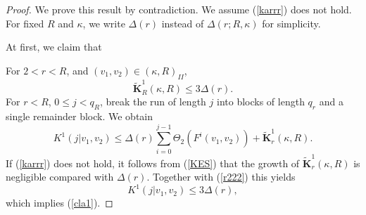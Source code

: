 \documentclass[10pt,a4paper]{amsart}
\begin{document}
\begin{proof}
We prove this result by contradiction. We assume (\ref{karrr}) does not hold.  For fixed $R$ and $\kappa$, we write $\Delta(r)$ instead of $\Delta(r;R,\kappa)$ for simplicity.

At first, we claim that

For $2< r<R$, and $(v_1,v_2)\in (\kappa,R)_{II}$,
\begin{equation}\label{cla1}
\widetilde{\mathbf{K}}_R^1(\kappa,R)\leq 3\Delta(r).
\end{equation}
For $r<R$, $0\leq j<q_R$, break the run of length $j$ into blocks of length $q_r$ and a single remainder block. We obtain
\begin{equation}\label{wan}
{K^1(j|v_1,v_2)\leq \Delta(r)\sum_{i=0}^{j-1}\Theta_2(F^i(v_1,v_2))+\widetilde{\mathbf{K}}_r^1(\kappa,R).}
\end{equation}
If (\ref{karrr}) does not hold, it follows from (\ref{KES}) that the growth of \(\widetilde{\mathbf{K}}_r^1(\kappa,R)\) is negligible compared with \(\Delta(r)\). Together with (\ref{r222}) this yields
\[K^1(j|v_1,v_2)\leq 3\Delta(r),\]
which implies (\ref{cla1}).






\end{proof}
\end{document}
